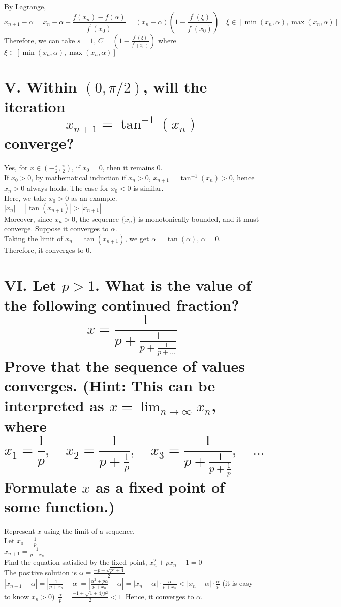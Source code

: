 \documentclass[a4paper]{article}
\begin{document}
By Lagrange,
\[
x_{n+1}-\alpha = x_n-\alpha-\frac{f(x_n)-f(\alpha)}{f^{'}(x_0)} = (x_n-\alpha)\left(1-\frac{f^{'}(\xi)}{f^{'}(x_0)}\right) \quad \xi \in [\min(x_n,\alpha), \max(x_n,\alpha)]
\]
Therefore, we can take \( s = 1 \), \( C = \left(1-\frac{f^{'}(\xi)}{f^{'}(x_0)}\right) \) where \( \xi \in [\min(x_n,\alpha), \max(x_n,\alpha)] \)

\section*{V. Within \( (0, \pi/2) \), will the iteration
\[
x_{n+1} = \tan^{-1}(x_n)
\]
converge?}

Yes, for \( x \in \left(-\frac{\pi}{2}, \frac{\pi}{2}\right) \), if \( x_0 = 0 \), then it remains 0.\\
If \( x_0 > 0 \), by mathematical induction if \( x_n > 0 \), \( x_{n+1} = \tan^{-1}(x_n) > 0 \), hence \( x_n > 0 \) always holds. The case for \( x_0 < 0 \) is similar.\\
Here, we take \( x_0 > 0 \) as an example.\\
\( |x_n| = |\tan(x_{n+1})| > |x_{n+1}| \)\\
Moreover, since \( x_n > 0 \), the sequence \( \{x_n\} \) is monotonically bounded, and it must converge. Suppose it converges to \( \alpha \).\\
Taking the limit of \( x_n = \tan(x_{n+1}) \), we get \( \alpha = \tan(\alpha) \), \( \alpha = 0 \).\\
Therefore, it converges to 0.

\section*{VI. Let \( p > 1 \). What is the value of the following continued fraction?
\[
x = \frac{1}{p + \frac{1}{p + \frac{1}{p + \ldots}}}
\]
Prove that the sequence of values converges. (Hint: This can be interpreted as \( x = \lim_{n \to \infty} x_n \), where 
\[
x_1 = \frac{1}{p}, \quad x_2 = \frac{1}{p + \frac{1}{p}}, \quad x_3 = \frac{1}{p + \frac{1}{p + \frac{1}{p}}}, \quad \ldots
\]
Formulate \( x \) as a fixed point of some function.)}

Represent \( x \) using the limit of a sequence.\\
Let \( x_0 = \frac{1}{p} \)\\
\( x_{n+1} = \frac{1}{p + x_n} \)\\
Find the equation satisfied by the fixed point, \( x_n^2 + px_n - 1 = 0 \)\\
The positive solution is \( \alpha = \frac{-p + \sqrt{p^2 + 4}}{2} \)\\
\( |x_{n+1} - \alpha| = \left|\frac{1}{p + x_n} - \alpha\right| = \left|\frac{\alpha^2 + p\alpha}{p + x_n} - \alpha\right| = |x_n - \alpha| \cdot \frac{\alpha}{p + x_n} < |x_n - \alpha| \cdot \frac{\alpha}{p} \) (it is easy to know \( x_n > 0 \))\
\( \frac{\alpha}{p} = \frac{-1 + \sqrt{1 + 4/p^2}}{2} < 1 \)\
Hence, it converges to \( \alpha \).
\end{document}
